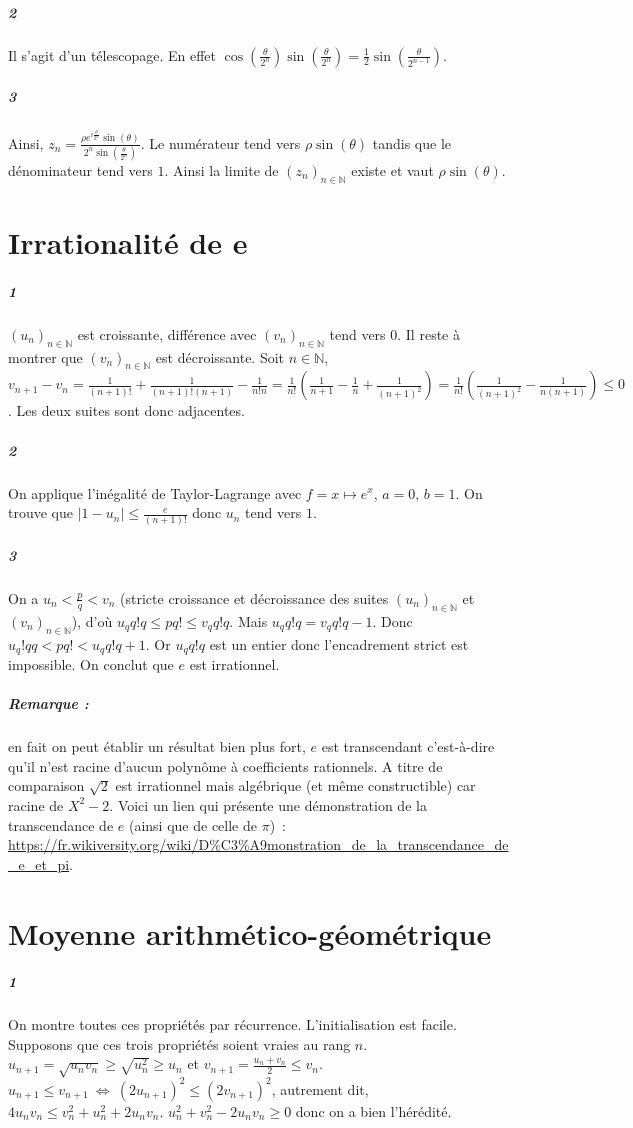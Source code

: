 \documentclass[10pt,a4paper]{article}
\newcommand{\seq}[2]{\left( #1_{#2} \right)_{#2 \in \mathbb{N}} }
\newcommand{\vertt}[1]{\vert #1 \vert}
\begin{document}
\subparagraph{2}Il s'agit d'un télescopage. En effet $\cos(\frac{\theta}{2^n})\sin(\frac{\theta}{2^n}) = \frac{1}{2}\sin(\frac{\theta}{2^{n-1}})$. 

\subparagraph{3}Ainsi, $z_n = \frac{\rho e^{i\frac{\theta}{2^n}} \sin(\theta)}{2^n \sin( \frac{\theta}{2^n})}$. Le numérateur tend vers $\rho \sin(\theta)$ tandis que le dénominateur tend vers $1$. Ainsi la limite de $\seq{z}{n}$ existe et vaut $\rho \sin(\theta)$.

\section{Irrationalité de e}

\subparagraph{1}$\seq{u}{n}$ est croissante, différence avec $\seq{v}{n}$ tend vers $0$. Il reste à montrer que $\seq{v}{n}$ est décroissante. Soit $n \in \mathbb{N}$, $v_{n+1} - v_n = \frac{1}{(n+1)!} + \frac{1}{(n+1)!(n+1)} - \frac{1}{n!n} = \frac{1}{n!}( \frac{1}{n+1}- \frac{1}{n} + \frac{1}{(n+1)^2}) = \frac{1}{n!}( \frac{1}{(n+1)^2} - \frac{1}{n(n+1)}) \le 0$. Les deux suites sont donc adjacentes.

\subparagraph{2} On applique l'inégalité de Taylor-Lagrange avec $f = x\mapsto e^x$, $a =0$, $b=1$.
On trouve que $\vertt{1 - u_n} \le \frac{e}{(n+1)!}$ donc $u_n$ tend vers $1$.

\subparagraph{3} On a $u_n < \frac{p}{q} < v_n$ (stricte croissance et décroissance des suites $\seq{u}{n}$ et $\seq{v}{n}$), d'où $u_qq!q \le pq! \le v_q q! q$. Mais $u_qq!q = v_qq!q -1$. Donc $u_q!qq < pq! < u_qq!q +1$. Or $u_qq!q$ est un entier donc l'encadrement strict est impossible. On conclut que $e$ est irrationnel. 

\subparagraph{Remarque :} en fait on peut établir un résultat bien plus fort, $e$ est transcendant c'est-à-dire qu'il n'est racine d'aucun polynôme à coefficients rationnels. A titre de comparaison $\sqrt{2}$ est irrationnel mais algébrique (et même constructible) car racine de $X^2-2$. Voici un lien qui présente une démonstration de la transcendance de $e$ (ainsi que de celle de $\pi$)~: \url{https://fr.wikiversity.org/wiki/D%C3%A9monstration_de_la_transcendance_de_e_et_pi}.
\section{Moyenne arithmético-géométrique}
\subparagraph{1}On montre toutes ces propriétés par récurrence. L'initialisation est facile. Supposons que ces trois propriétés soient vraies au rang $n$. $u_{n+1} = \sqrt{u_n v_n} \ge \sqrt{u_n^2} \ge u_n$ et $v_{n+1} = \frac{u_n + v_n}{2} \le v_n$. ${u_{n+1} \le v_{n+1} \ \Leftrightarrow \ (2u_{n+1})^2 \le (2v_{n+1})^2}$, autrement dit, $4u_nv_n \le v_n^2 + u_n^2 + 2u_nv_n$. $u_n^2+v_n^2-2u_nv_n \ge 0$ donc on a bien l'hérédité.
\end{document}
